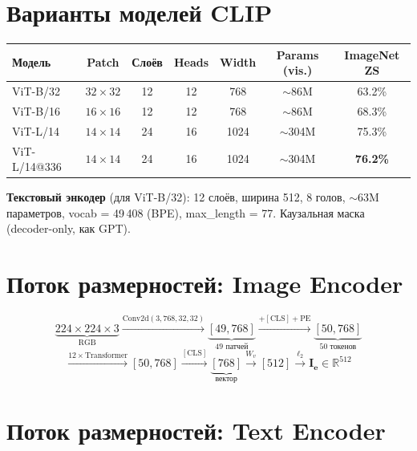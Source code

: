 \documentclass[12pt,a4paper]{article}
\begin{document}
\newpage


\section*{Варианты моделей CLIP}

\begin{center}
\begin{tabular}{lcccccc}
\toprule
\textbf{Модель} & \textbf{Patch} & \textbf{Слоёв} & \textbf{Heads} & \textbf{Width} & \textbf{Params (vis.)} & \textbf{ImageNet ZS} \\
\midrule
ViT-B/32     & $32\!\times\!32$ & 12 & 12 & 768  & $\sim$86M  & 63.2\% \\
ViT-B/16     & $16\!\times\!16$ & 12 & 12 & 768  & $\sim$86M  & 68.3\% \\
ViT-L/14     & $14\!\times\!14$ & 24 & 16 & 1024 & $\sim$304M & 75.3\% \\
\rowcolor{simgreen!30}
ViT-L/14@336 & $14\!\times\!14$ & 24 & 16 & 1024 & $\sim$304M & \textbf{76.2\%} \\
\bottomrule
\end{tabular}
\end{center}

\medskip

\noindent\textbf{Текстовый энкодер} (для ViT-B/32): 12 слоёв, ширина 512, 8 голов,
$\sim$63M параметров, vocab = 49\,408 (BPE), max\_length = 77.
Каузальная маска (decoder-only, как GPT).


\section*{Поток размерностей: Image Encoder}

\[
\underbrace{224\!\times\!224\!\times\!3}_{\text{RGB}}
\xrightarrow{\text{Conv2d}(3,768,32,32)}
\underbrace{[49, 768]}_{\text{49 патчей}}
\xrightarrow{+[\mathrm{CLS}]+\mathrm{PE}}
\underbrace{[50, 768]}_{\text{50 токенов}}
\]
\[
\xrightarrow{12\times\text{Transformer}}
[50, 768]
\xrightarrow{[\mathrm{CLS}]}
\underbrace{[768]}_{\text{вектор}}
\xrightarrow{W_v}
[512]
\xrightarrow{\ell_2}
\boxed{\mathbf{I_e} \in \mathbb{R}^{512}}
\]


\section*{Поток размерностей: Text Encoder}
\end{document}
